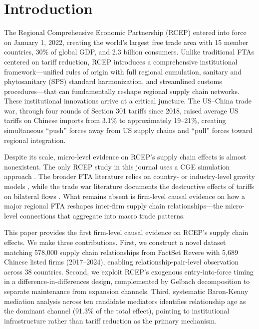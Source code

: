 \documentclass[preprint,12pt,authoryear]{elsarticle}
\begin{document}
\section{Introduction}
\label{sec:introduction}

The Regional Comprehensive Economic Partnership (RCEP) entered into force on January 1, 2022, creating the world's largest free trade area with 15 member countries, 30\% of global GDP, and 2.3 billion consumers. Unlike traditional FTAs centered on tariff reduction, RCEP introduces a comprehensive institutional framework---unified rules of origin with full regional cumulation, sanitary and phytosanitary (SPS) standard harmonization, and streamlined customs procedures---that can fundamentally reshape regional supply chain networks. These institutional innovations arrive at a critical juncture. The US--China trade war, through four rounds of Section 301 tariffs since 2018, raised average US tariffs on Chinese imports from 3.1\% to approximately 19--21\%, creating simultaneous ``push'' forces away from US supply chains and ``pull'' forces toward regional integration.

Despite its scale, micro-level evidence on RCEP's supply chain effects is almost nonexistent. The only RCEP study in this journal uses a CGE simulation approach \citep{sun2023estimating}. The broader FTA literature relies on country- or industry-level gravity models \citep{baier2019gravity}, while the trade war literature documents the destructive effects of tariffs on bilateral flows \citep{fajgelbaum2020return}. What remains absent is firm-level causal evidence on how a major regional FTA reshapes inter-firm supply chain relationships---the micro-level connections that aggregate into macro trade patterns.

This paper provides the first firm-level causal evidence on RCEP's supply chain effects. We make three contributions. First, we construct a novel dataset matching 578,000 supply chain relationships from FactSet Revere with 5,689 Chinese listed firms (2017--2024), enabling relationship-pair-level observation across 38 countries. Second, we exploit RCEP's exogenous entry-into-force timing in a difference-in-differences design, complemented by Gelbach decomposition to separate maintenance from expansion channels. Third, systematic Baron-Kenny mediation analysis across ten candidate mediators identifies relationship age as the dominant channel (91.3\% of the total effect), pointing to institutional infrastructure rather than tariff reduction as the primary mechanism.
\end{document}
